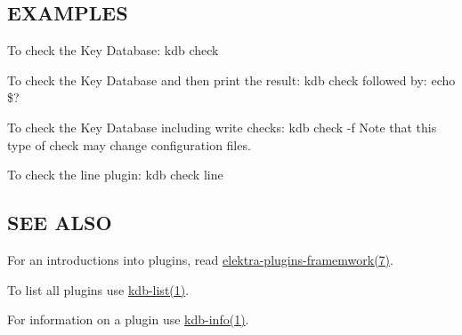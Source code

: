 \subsection*{E\+X\+A\+M\+P\+L\+E\+S}

To check the Key Database\+: {\ttfamily kdb check}

To check the Key Database and then print the result\+: {\ttfamily kdb check} followed by\+: {\ttfamily echo \$?}

To check the Key Database including write checks\+: {\ttfamily kdb check -\/f} Note that this type of check may change configuration files.

To check the {\ttfamily line} plugin\+: {\ttfamily kdb check line}

\subsection*{S\+E\+E A\+L\+S\+O}


\begin{DoxyItemize}
\item For an introductions into plugins, read \hyperlink{md_doc_help_elektra-plugins-framework_doc_help_elektra-plugins-framework_md}{elektra-\/plugins-\/framemwork(7)}.
\item To list all plugins use \hyperlink{md_doc_help_kdb-list_doc_help_kdb-list_md}{kdb-\/list(1)}.
\item For information on a plugin use \hyperlink{md_doc_help_kdb-info_doc_help_kdb-info_md}{kdb-\/info(1)}. 
\end{DoxyItemize}